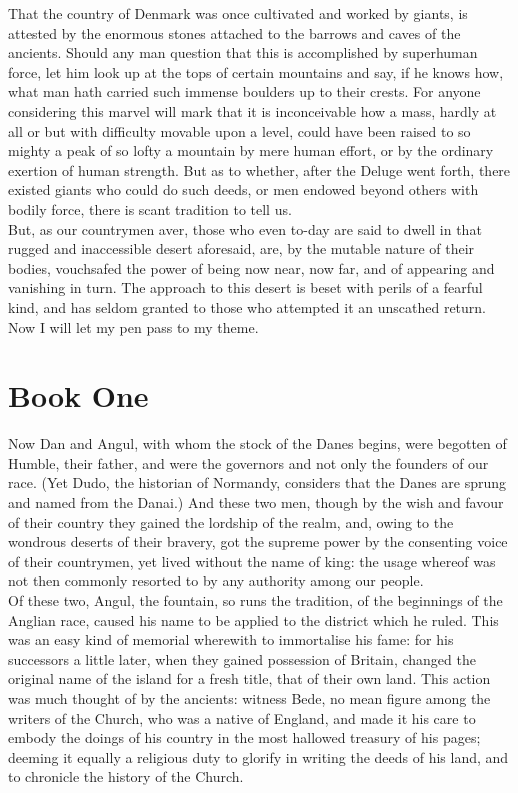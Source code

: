 \documentclass[10pt,a4paper]{report}
\begin{document}
That the country of Denmark was once cultivated and worked by giants, is attested by the enormous stones attached to the barrows and caves of the ancients. Should any man question that this is accomplished by superhuman force, let him look up at the tops of certain mountains and say, if he knows how, what man hath carried such immense boulders up to their crests. For anyone considering this marvel will mark that it is inconceivable how a mass, hardly at all or but with difficulty movable upon a level, could have been raised to so mighty a peak of so lofty a mountain by mere human effort, or by the ordinary exertion of human strength. But as to whether, after the Deluge went forth, there existed giants who could do such deeds, or men endowed beyond others with bodily force, there is scant tradition to tell us.\\

But, as our countrymen aver, those who even to-day are said to dwell in that rugged and inaccessible desert aforesaid, are, by the mutable nature of their bodies, vouchsafed the power of being now near, now far, and of appearing and vanishing in turn. The approach to this desert is beset with perils of a fearful kind, and has seldom granted to those who attempted it an unscathed return. Now I will let my pen pass to my theme.


\chapter{Book One}

Now Dan and Angul, with whom the stock of the Danes begins, were begotten of Humble, their father, and were the governors and not only the founders of our race. (Yet Dudo, the historian of Normandy, considers that the Danes are sprung and named from the Danai.) And these two men, though by the wish and favour of their country they gained the lordship of the realm, and, owing to the wondrous deserts of their bravery, got the supreme power by the consenting voice of their countrymen, yet lived without the name of king: the usage whereof was not then commonly resorted to by any authority among our people.\\

Of these two, Angul, the fountain, so runs the tradition, of the beginnings of the Anglian race, caused his name to be applied to the district which he ruled. This was an easy kind of memorial wherewith to immortalise his fame: for his successors a little later, when they gained possession of Britain, changed the original name of the island for a fresh title, that of their own land. This action was much thought of by the ancients: witness Bede, no mean figure among the writers of the Church, who was a native of England, and made it his care to embody the doings of his country in the most hallowed treasury of his pages; deeming it equally a religious duty to glorify in writing the deeds of his land, and to chronicle the history of the Church.\\
\end{document}
